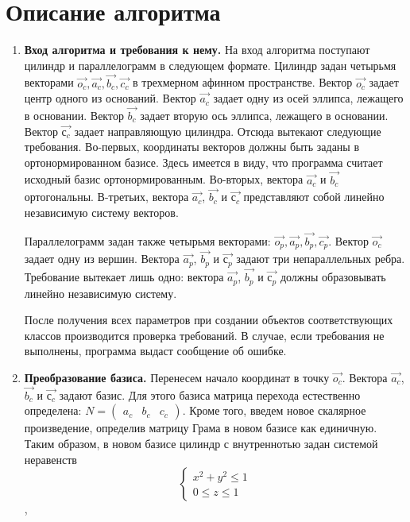 \documentclass[pdftex,ptm,12pt,a4paper]{report}
\begin{document}
\chapter{Описание алгоритма}
\begin{enumerate}
  \item 
      \textbf{Вход алгоритма и требования к нему.}
      На вход алгоритма поступают цилиндр и параллелограмм в следующем формате.
      Цилиндр задан четырьмя векторами $\vec{o_c}, \vec{a_c}, \vec{b_c}, \vec{c_c}$ в трехмерном афинном пространстве.
      Вектор $\vec{o_c}$ задает центр одного из оснований.
      Вектор $\vec{a_c}$ задает одну из осей эллипса, лежащего в основании.
      Вектор $\vec{b_c}$ задает вторую ось эллипса, лежащего в основании.
      Вектор $\vec{с_c}$ задает направляющую цилиндра.
      Отсюда вытекают следующие требования.
      Во-первых, координаты векторов должны быть заданы в ортонормированном базисе. 
      Здесь имеется в виду, что программа считает исходный базис ортонормированным.
      Во-вторых, вектора $\vec{a_c}$ и $\vec{b_c}$ ортогональны.
      В-третьих, вектора $\vec{a_c}$, $\vec{b_c}$ и $\vec{с_c}$ представляют собой линейно независимую систему векторов.

      Параллелограмм задан также четырьмя векторами: $\vec{o_p}, \vec{a_p}, \vec{b_p}, \vec{c_p}$.
      Вектор $\vec{o_c}$ задает одну из вершин.
      Вектора $\vec{a_p}$, $\vec{b_p}$ и $\vec{с_p}$ задают три непараллельных ребра.
      Требование вытекает лишь одно: вектора $\vec{a_p}$, $\vec{b_p}$ и $\vec{с_p}$ должны образовывать линейно независимую систему.

      После получения всех параметров при создании объектов соответствующих классов производится проверка требований. 
      В случае, если требования не выполнены, программа выдаст сообщение об ошибке.
  \item
    \textbf{Преобразование базиса.}
      Перенесем начало координат в точку $\vec{o_c}$. 
      Вектора $\vec{a_c}$, $\vec{b_c}$ и $\vec{с_c}$ задают базис.
      Для этого базиса матрица перехода естественно определена:
      $N = \begin{pmatrix} {a_c} & {b_c} & c_{c} \end{pmatrix}$.
      Кроме того, введем новое скалярное произведение, определив матрицу Грама в новом базисе как единичную.
      Таким образом, в новом базисе цилиндр с внутреннотью задан системой неравенств 
      \begin{equation}\label{cnb}
          \begin{cases}
          x^2 + y^2   \le  1  \\
          0 \le  z   \le  1
          \end{cases}
      \end{equation}, 


\end{enumerate}
\end{document}
